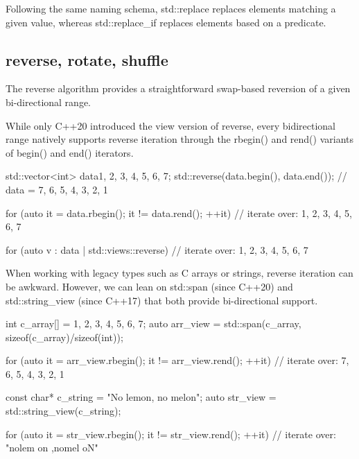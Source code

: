 Following the same naming schema, std::replace replaces elements matching a given value, whereas std::replace\_if replaces elements based on a predicate.

\begin{box-note}
\end{box-note}

\subsection{reverse, rotate, shuffle}

The reverse algorithm provides a straightforward swap-based reversion of a given bi-directional range.



While only C++20 introduced the view version of reverse, every bidirectional range natively supports reverse iteration through the rbegin() and rend() variants of begin() and end() iterators.

\begin{box-note}
\begin{cppcode}
std::vector<int> data{1, 2, 3, 4, 5, 6, 7};
std::reverse(data.begin(), data.end());
// data = {7, 6, 5, 4, 3, 2, 1}

for (auto it = data.rbegin(); it != data.rend(); ++it) {
    // iterate over: 1, 2, 3, 4, 5, 6, 7
}

for (auto v : data | std::views::reverse) {
    // iterate over: 1, 2, 3, 4, 5, 6, 7
}
\end{cppcode}
\end{box-note}

When working with legacy types such as C arrays or strings, reverse iteration can be awkward. However, we can lean on std::span (since C++20) and std::string\_view (since C++17) that both provide bi-directional support.

\begin{box-note}
\begin{cppcode}
int c_array[] = {1, 2, 3, 4, 5, 6, 7};
auto arr_view = std::span(c_array, sizeof(c_array)/sizeof(int));

for (auto it = arr_view.rbegin(); it != arr_view.rend(); ++it) {
    // iterate over: {7, 6, 5, 4, 3, 2, 1}
}

const char* c_string = "No lemon, no melon";
auto str_view = std::string_view(c_string);

for (auto it = str_view.rbegin(); it != str_view.rend(); ++it) {
    // iterate over: "nolem on ,nomel oN"
}
\end{cppcode}
\end{box-note}

